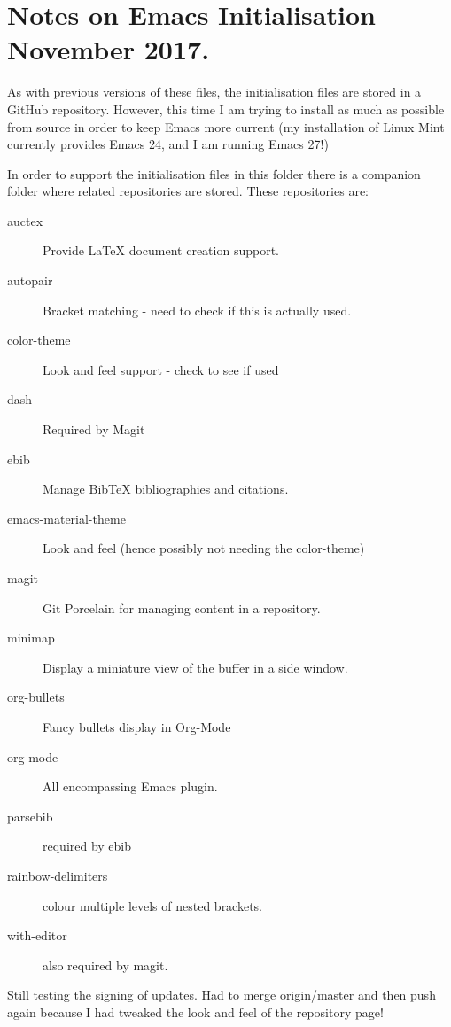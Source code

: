 \documentclass[a4paper]{article}
\begin{document}
\section{Notes on Emacs Initialisation November 2017.}
\label{sec:notes-emacs-init}

As with previous versions of these files, the initialisation files are
stored in a GitHub repository.  However, this time I am trying to
install as much as possible from source in order to keep Emacs more
current (my installation of Linux Mint currently provides Emacs 24,
and I am running Emacs 27!)

In order to support the initialisation files in this folder there is a
companion folder where related repositories are stored. These
repositories are:

\begin{description}
\item[auctex] Provide \LaTeX{} document creation support.
\item[autopair] Bracket matching - need to check if this is actually used.
\item[color-theme] Look and feel support - check to see if used
\item[dash] Required by Magit
\item[ebib] Manage BibTeX bibliographies and citations.
\item[emacs-material-theme] Look and feel (hence possibly not needing
  the color-theme)
\item[magit] Git Porcelain for managing content in a repository.
\item[minimap] Display a miniature view of the buffer in a side window.
\item[org-bullets] Fancy bullets display in Org-Mode
\item[org-mode] All encompassing Emacs plugin.
\item[parsebib] required by ebib
\item[rainbow-delimiters] colour multiple levels of nested brackets.
\item[with-editor] also required by magit.
\end{description}

Still testing the signing of updates. Had to merge origin/master and then push again because I had tweaked the look and feel of the repository page!
\end{document}
